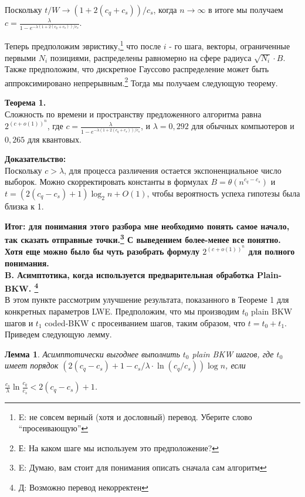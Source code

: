 \documentclass[a4paper,11pt]{article}
\newtheorem{lemma}[theorem]{Лемма}
\begin{document}
Поскольку $t/W \rightarrow (1+2(c_q + c_s))/c_s$, когда $n \rightarrow \infty$ в итоге мы получаем $c=\frac{\lambda}{1-e^{- \lambda(1+2(c_q + c_s))/c_s}}$.

Теперь предположим эвристику,\footnote{E: не совсем верный (хотя и дословный) перевод. Уберите слово ``просеивающую''} что после $i$ - го шага, векторы, ограниченные первыми $N_i$ позициями, распределены равномерно на сфере радиуса $\sqrt{N_i}\cdot B$. Также предположим, что дискретное Гауссово распределение может быть аппроксимировано непрерывным.\footnote{Е: На каком шаге мы используем это предположение?} Тогда мы получаем следующую теорему.

\textbf{Теорема 1.}\\
Сложность по времени и пространству предложенного алгоритма равна $2^{(c+o(1))^n}$, где $c=\frac{\lambda}{1-e^{- \lambda(1+2(c_q + c_s))/c_s}}$, и $\lambda = 0,292$ для обычных компьютеров и $0,265$ для квантовых.

\textbf{Доказательство:}\\
Поскольку $c> \lambda$, для процесса различения остается экспоненциальное число выборок. Можно скорректировать константы в формулах $B=\theta(n^{c_q-c_s})$ и $t=(2(c_q-c_s)+1)\log_2 n + O(1)$, чтобы вероятность успеха гипотезы была близка к 1.

\textbf{Итог: для понимания этого разбора мне необходимо понять самое начало, так сказать отправные точки.\footnote{E: Думаю, вам стоит для понимания описать сначала сам алгоритм} С выведением более-менее все понятно. Хотя еще можно было бы чуть разобрать формулу $2^{(c+o(1))^n}$ для полного понимания.}\\

\textbf {B. Асимптотика, когда используется предварительная обработка Plain-BKW. \footnote{Д: Возможно перевод некорректен}}\\

В этом пункте рассмотрим улучшение результата, показанного в Теореме 1 для конкретных параметров LWE. Предположим, что мы производим $t_0$ plain BKW шагов и $t_1$ coded-BKW с просеиванием шагов, таким образом, что $t=t_0+t_1$. Приведем следующую лемму.

\begin{lemma}
Асимптотически выгоднее выполнить $t_0$ plain BKW шагов, где $t_0$ имеет порядок $(2(c_q - c_s)+1-c_s/\lambda \cdot \ln{(c_q/c_s)}) \log{n}$, если\\
\begin{center}
$\frac{c_s}{\lambda}\ln{\frac{c_q}{c_s}} < 2(c_q - c_s) + 1$.
\end{center}
\end{lemma}
\end{document}
